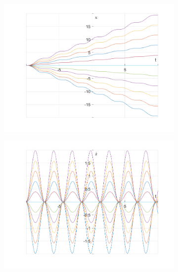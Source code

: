 \documentclass{article}
\begin{document}
	\begin{figure}[h!]
		\centering
		\begin{subfigure}[b]{0.48\linewidth}
			\includegraphics[width=\linewidth]{./SmallOscillations/S9/F3.png}
		\end{subfigure}
		\begin{subfigure}[b]{0.48\linewidth}
			\includegraphics[width=\linewidth]{./SmallOscillations/S9/F4.png}
		\end{subfigure}
	\end{figure}
\end{document}
